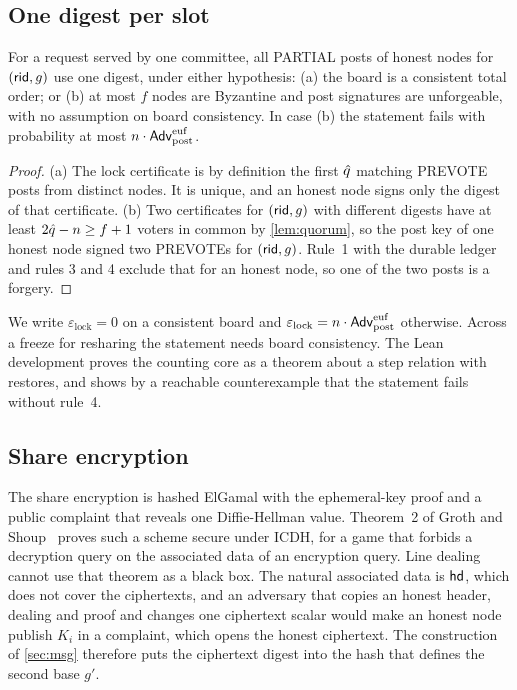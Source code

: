 \subsection{One digest per slot}

\begin{lemma}\label{lem:digest}
For a request served by one committee, all PARTIAL posts of honest nodes for $(\mathsf{rid}, g)$ use one digest, under either hypothesis: \textup{(a)} the board is a consistent total order; or \textup{(b)} at most $f$ nodes are Byzantine and post signatures are unforgeable, with no assumption on board consistency. In case \textup{(b)} the statement fails with probability at most $n \cdot \mathsf{Adv}^{\mathrm{euf}}_{\mathrm{post}}$.
\end{lemma}

\begin{proof}
(a) The lock certificate is by definition the first $\hat{q}$ matching PREVOTE posts from distinct nodes. It is unique, and an honest node signs only the digest of that certificate. (b) Two certificates for $(\mathsf{rid}, g)$ with different digests have at least $2\hat{q} - n \ge f+1$ voters in common by \cref{lem:quorum}, so the post key of one honest node signed two PREVOTEs for $(\mathsf{rid}, g)$. Rule~1 with the durable ledger and rules 3 and 4 exclude that for an honest node, so one of the two posts is a forgery.
\end{proof}

We write $\varepsilon_{\mathrm{lock}} = 0$ on a consistent board and $\varepsilon_{\mathrm{lock}} = n \cdot \mathsf{Adv}^{\mathrm{euf}}_{\mathrm{post}}$ otherwise. Across a freeze for resharing the statement needs board consistency. The Lean development proves the counting core as a theorem about a step relation with restores, and shows by a reachable counterexample that the statement fails without rule~4.

\subsection{Share encryption}

The share encryption is hashed ElGamal with the ephemeral-key proof and a public complaint that reveals one Diffie-Hellman value. Theorem~2 of Groth and Shoup~\cite[pp.~29--32]{GS22} proves such a scheme secure under ICDH, for a game that forbids a decryption query on the associated data of an encryption query. Line dealing cannot use that theorem as a black box. The natural associated data is $\mathsf{hd}$, which does not cover the ciphertexts, and an adversary that copies an honest header, dealing and proof and changes one ciphertext scalar would make an honest node publish $K_i$ in a complaint, which opens the honest ciphertext. The construction of \cref{sec:msg} therefore puts the ciphertext digest into the hash that defines the second base $g'$.


